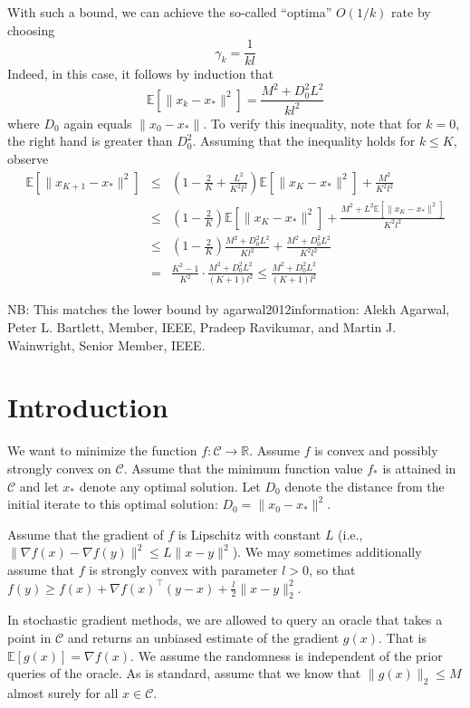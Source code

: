 With such a bound, we can achieve the so-called ``optima'' $O(1/k)$ rate by choosing
\begin{equation} \label{eq:eqproof23}
\gamma_k = \frac{1}{kl}
\end{equation}
Indeed, in this case, it follows by induction that
\begin{equation} \label{eq:eqproof24}
\mathbb{E}[\|x_k-x_*\|^2] = \frac{M^2+D_0^2 L^2}{kl^2}
\end{equation}
where $D_0$ again equals $\|x_0 - x_*\|$. To verify this inequality, note that for $k = 0$, the right hand is greater than $D_0^2$. Assuming that the inequality holds for $k \leq K$, observe
\begin{eqnarray}
\mathbb{E}[\|x_{K+1}-x_*\|^2] &\leq& \left( 1-\frac{2}{K} + \frac{L^2}{K^2 l^2} \right) \mathbb{E}[\|x_K-x_*\|^2] + \frac{M^2}{K^2 l^2} \\
&\leq& \left( 1-\frac{2}{K} \right) \mathbb{E}[\|x_K-x_*\|^2]+\frac{M^2+L^2 \mathbb{E} [\|x_K-x_*\|^2]}{K^2 l^2} \\
&\leq& \left( 1-\frac{2}{K} \right) \frac{M^2+D_0^2 L^2}{K l^2}+\frac{M^2+D_0
^2 L^2}{K^2 l^2} \\
&=& \frac{K^2-1}{K^2}\cdot \frac{M^2 +D_0^2 L^2}{(K+1) l^2} \leq \frac{M^2 +D_0^2 L^2}{(K+1)l^2}
\end{eqnarray}

NB: This matches the lower bound by {\color{red} agarwal2012information: Alekh Agarwal, Peter L. Bartlett, Member, IEEE, Pradeep Ravikumar, and Martin J. Wainwright, Senior Member, IEEE.}

\section{Introduction}
We want to minimize the function $f: \mathcal{C} \to \mathbb{R}$. Assume $f$ is convex and possibly strongly convex on $\mathcal{C}$. Assume that the minimum function value $f_*$ is attained in $\mathcal{C}$ and let $x_*$ denote any optimal solution. Let $D_0$ denote the distance from the initial iterate to this optimal solution: $D_0 = \|x_0 - x_*\|^2$.

Assume that the gradient of $f$ is Lipschitz with constant $L$ (i.e., $\|\nabla f(x)- \nabla f(y)\|^2 \leq L\|x-y\|^2$).
We may sometimes additionally assume that $f$ is strongly convex with parameter $l > 0$, so that
$f(y)\geq f(x)+\nabla f(x)^\top (y-x)+ \frac{l}{2}\|x-y\|^2_2$.

In stochastic gradient methods, we are allowed to query an oracle that takes a point in $\mathcal{C}$ and returns an unbiased estimate of the gradient $g(x)$. That is $\mathbb{E}[g(x)] = \nabla f(x)$. We assume the randomness is independent of the prior queries of the oracle. As is standard, assume that we know that $\|g(x)\|_2 \leq M$ almost surely for all $x \in \mathcal{C}$.

